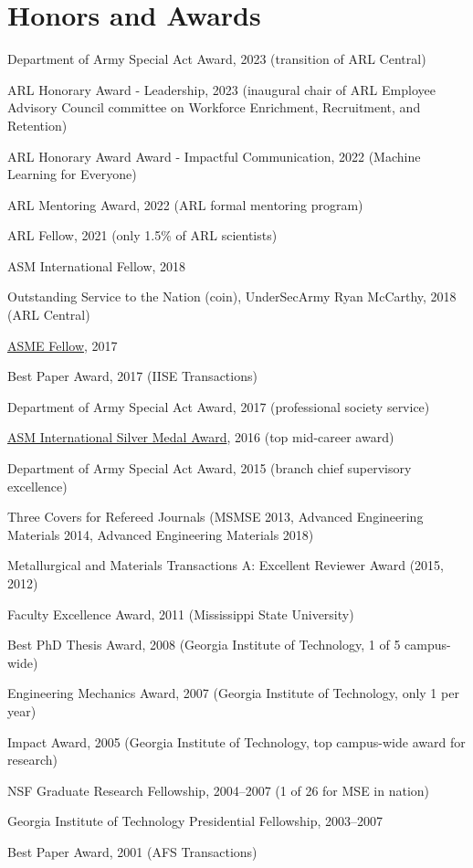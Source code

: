 \section{\sc Honors and Awards} 

\begin{list2}
\item Department of Army Special Act Award, 2023 (transition of ARL Central)

\item ARL Honorary Award - Leadership, 2023 (inaugural chair of ARL Employee Advisory Council committee on Workforce Enrichment, Recruitment, and Retention)

\item ARL Honorary Award Award - Impactful Communication, 2022 (Machine Learning for Everyone)

\item ARL Mentoring Award, 2022 (ARL formal mentoring program)

\item ARL Fellow, 2021 (only 1.5\% of ARL scientists)

\item ASM International Fellow, 2018

\item Outstanding Service to the Nation (coin), UnderSecArmy Ryan McCarthy, 2018 (ARL Central)

\item \href{https://www.army.mil/article/189539/}{ASME Fellow}, 2017

\item Best Paper Award, 2017 (IISE Transactions)

\item Department of Army Special Act Award, 2017 (professional society service)

\item \href{http://www.arl.army.mil/www/default.cfm?article=2828}{ASM International Silver Medal Award}, 2016 (top mid-career award)

\item Department of Army Special Act Award, 2015 (branch chief supervisory excellence)
\item Three Covers for Refereed Journals (MSMSE 2013, Advanced Engineering Materials 2014, Advanced Engineering Materials 2018)
\item Metallurgical and Materials Transactions A: Excellent Reviewer Award (2015, 2012)
\item Faculty Excellence Award, 2011 (Mississippi State University)
\item Best PhD Thesis Award, 2008 (Georgia Institute of Technology, 1 of 5 campus-wide)
\item Engineering Mechanics Award, 2007 (Georgia Institute of Technology, only 1 per year)
\item Impact Award, 2005 (Georgia Institute of Technology, top campus-wide award for research)
\item NSF Graduate Research Fellowship, 2004--2007 (1 of 26 for MSE in nation)
\item Georgia Institute of Technology Presidential Fellowship, 2003--2007
\item Best Paper Award, 2001 (AFS Transactions)

\end{list2}

